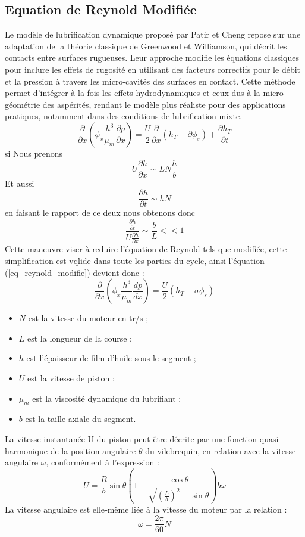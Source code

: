 \subsection{Equation de Reynold Modifiée}
Le modèle de lubrification dynamique proposé par Patir et Cheng repose sur une adaptation de la théorie classique de Greenwood et Williamson, qui décrit les contacts entre surfaces rugueuses. Leur approche modifie les équations classiques pour inclure les effets de rugosité en utilisant des facteurs correctifs pour le débit et la pression à travers les micro-cavités des surfaces en contact. Cette méthode permet d'intégrer à la fois les effets hydrodynamiques et ceux dus à la micro-géométrie des aspérités, rendant le modèle plus réaliste pour des applications pratiques, notamment dans des conditions de lubrification mixte.\cite{tribo1}
\begin{equation}
	\frac{\partial}{\partial x}(\phi_{x} \frac{h^3}{\mu_{m}} \frac{\partial p}{\partial x}) = \frac{U}{2} \frac{\partial}{\partial x}(h_{T}-\partial \phi_{s})+\frac{\partial h_{T}}{\partial t}
	\label{eq_reynold_modifie}
\end{equation}
si Nous prenons 
$$ U \frac{\partial h}{\partial x} \sim LN \frac{h}{b}$$
Et aussi 
$$\frac{\partial h}{\partial t} \sim hN $$
en faisant le rapport de ce deux nous obtenons donc 
$$ \frac{\frac{\partial h}{\partial t}}{U\frac{\partial h}{\partial x}} \sim \frac{b}{L}<< 1 $$
Cette maneuvre viser à reduire l'équation de Reynold tels que modifiée, cette simplification est vqlide dans toute les parties du cycle, ainsi l'équation (\ref{eq_reynold_modifie}) devient donc :
\begin{equation}
	\frac{\partial}{\partial x}\left(\phi_{x} \frac{h^3}{\mu_{m}} \frac{dp}{dx}\right) =\frac{U}{2}\left(h_{T}-\sigma \phi_{s}\right)
	\label{eq_reynold_simplifie}
\end{equation}
\begin{itemize}
	\item $N$ est la vitesse du moteur en tr/s ;
	\item $L$ est la longueur de la course ;
	\item $h$ est l'épaisseur de film d'huile sous le segment ;
	\item $U$ est la vitesse de piston ;
	\item $\mu_{m}$ est la viscosité dynamique du lubrifiant ;
	\item $b$ est la taille axiale du segment.
\end{itemize}
La vitesse instantanée U du piston peut être décrite par une fonction quasi harmonique de la position angulaire $\theta$ du vilebrequin, en relation avec la vitesse angulaire $\omega$, conformément à l'expression :
\begin{equation}
	U =\frac{R}{b}\sin{\theta} \left(1-\frac{\cos\theta}{\sqrt{(\frac{L}{b})^2-\sin\theta}}\right)b\omega
\end{equation}
La vitesse angulaire est elle‐même liée à la vitesse du moteur par la relation :
\begin{equation}
	\omega =\frac{2\pi}{60}N
\end{equation}

